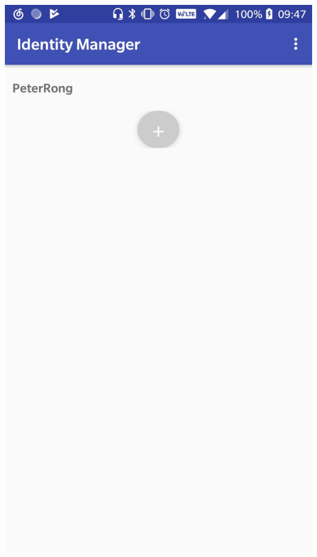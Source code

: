 \documentclass[a0,portrait]{poster}
\begin{document}
\begin{multicols}{2}
\begin{minipage}[b]{0.43\linewidth}
	\includegraphics[width=\linewidth]{figures/main-activity.jpg}
\end{minipage}


\end{multicols}
\end{document}
